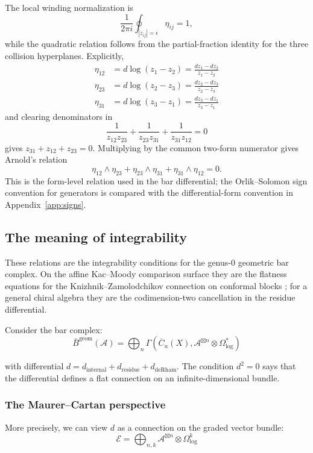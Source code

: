 The local winding normalization is
\[
\frac{1}{2\pi i}\oint_{|z_{ij}|=\epsilon}\eta_{ij}=1,
\]
while the quadratic relation follows from the partial-fraction
identity for the three collision hyperplanes.  Explicitly,
\begin{align}
\eta_{12} &= d\log(z_1 - z_2) = \frac{dz_1 - dz_2}{z_1 - z_2} \\
\eta_{23} &= d\log(z_2 - z_3) = \frac{dz_2 - dz_3}{z_2 - z_3} \\
\eta_{31} &= d\log(z_3 - z_1) = \frac{dz_3 - dz_1}{z_3 - z_1}
\end{align}
and clearing denominators in
\[
\frac{1}{z_{12}z_{23}}
+\frac{1}{z_{23}z_{31}}
+\frac{1}{z_{31}z_{12}}=0
\]
gives $z_{31}+z_{12}+z_{23}=0$.  Multiplying by the common
two-form numerator gives Arnold's relation
\[
\eta_{12}\wedge\eta_{23}
+\eta_{23}\wedge\eta_{31}
+\eta_{31}\wedge\eta_{12}=0.
\]
This is the form-level relation used in the bar differential; the
Orlik--Solomon sign convention for generators is compared with the
differential-form convention in Appendix~\ref{app:signs}.

\subsection{The meaning of integrability}

These relations are the integrability conditions for the genus-$0$
geometric bar complex.  On the affine Kac--Moody comparison surface
they are the flatness equations for the Knizhnik--Zamolodchikov
connection on conformal blocks \cite[Section~3.4]{BD04}; for a
general chiral algebra they are the codimension-two cancellation in
the residue differential.

Consider the bar complex:
\[\bar{B}^{\text{geom}}(\mathcal{A}) = \bigoplus_n \Gamma(\overline{C}_n(X), \mathcal{A}^{\boxtimes n} \otimes \Omega^*_{\log})\]

with differential $d = d_{\text{internal}} + d_{\text{residue}} + d_{\text{deRham}}$. The condition $d^2 = 0$ says that the differential defines a flat connection on an infinite-dimensional bundle.

\subsubsection{The Maurer--Cartan perspective}

More precisely, we can view $d$ as a connection on the graded vector bundle:
\[\mathcal{E} = \bigoplus_{n,k} \mathcal{A}^{\boxtimes n} \otimes \Omega^k_{\log}\]

